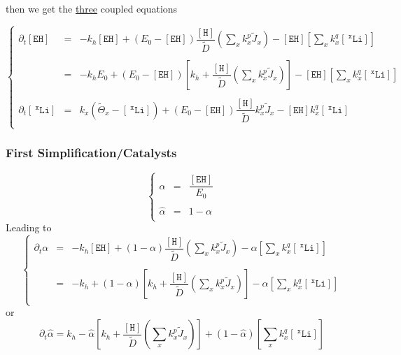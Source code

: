 \documentclass[aps,onecolumn,12pt]{revtex4}
\newcommand{\mychem}[1]{\mathtt{#1}}
\newcommand{\myconc}[1]{\left\lbrack{#1}\right\rbrack}
\newcommand{\spLi}[1]{{~^{\mychem{#1}}\mychem{Li}}}
\newcommand{\Li}[1]{\myconc{\spLi{#1}}}
\newcommand{\spEHin}{\mychem{EH}}
\newcommand{\EHin}{\myconc{\spEHin}}
\newcommand{\spproton}{\mychem{H}}
\newcommand{\proton}{\myconc{\spproton}}
\begin{document}
then we get the \underline{three} coupled equations  

\begin{equation}
\left\lbrace
	\begin{array}{rcl}
		\partial_t\EHin & = & -k_h \EHin + \left(E_0- \EHin\right) \dfrac{\proton}{\tilde{D}} \left(\sum_x k_x^p \tilde{J}_x \right)  
		- \EHin \left\lbrack {\sum_x k_x^q \Li{x}} \right\rbrack\\
		\\
		& = & 
		-k_h E_0+ \left(E_0- \EHin\right)\left\lbrack k_h+ \dfrac{\proton}{\tilde{D}} \left(\sum_x k_x^p \tilde{J}_x \right)\right] 
		- \EHin \left\lbrack {\sum_x k_x^q \Li{x}} \right\rbrack\\
		\\
		\partial_t\Li{x} & = & k_x \left(\tilde{\Theta}_x -\Li{x} \right)  + \left(E_0-\EHin\right) \dfrac{\proton}{\tilde{D}}   k_x^p \tilde{J}_x  - \EHin k_x^q \Li{x}\\
	\end{array}
\right.
\end{equation}


\subsubsection{First Simplification/Catalysts}
\begin{equation}
\left\lbrace
\begin{array}{rcl}
	\alpha & = & \dfrac{\EHin}{E_0}\\
	\\
	\hat\alpha & = & 1-\alpha\\
\end{array}
\right.
\end{equation}
Leading to
\begin{equation}
\left\lbrace
\begin{array}{rcl}
\partial_t\alpha & = & -k_h \EHin + \left(1- \alpha\right) \dfrac{\proton}{\tilde{D}} \left(\sum_x k_x^p \tilde{J}_x \right)  
		- \alpha \left\lbrack {\sum_x k_x^q \Li{x}} \right\rbrack\\
		\\
		& = & 
		-k_h + \left(1- \alpha\right)\left\lbrack k_h+ \dfrac{\proton}{\tilde{D}} \left(\sum_x k_x^p \tilde{J}_x \right)\right] 
		- \alpha \left\lbrack {\sum_x k_x^q \Li{x}} \right\rbrack\\\end{array}
\right.
\end{equation}
or
\begin{equation}
	\partial_t \hat\alpha = k_h - \hat\alpha \left\lbrack k_h+ \dfrac{\proton}{\tilde{D}} \left(\sum_x k_x^p \tilde{J}_x \right)\right] 
		+ (1-\hat\alpha) \left\lbrack {\sum_x k_x^q \Li{x}} \right\rbrack
\end{equation}
	
\end{document}
